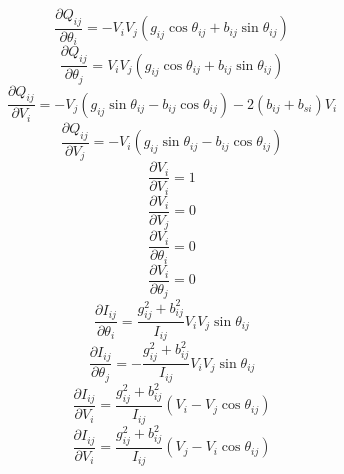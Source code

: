 \documentclass[12pt]{article}
\begin{document}
\begin{equation}
\frac{\partial Q_{ij}}{\partial \theta_i}  = -V_iV_j(g_{ij}\cos\theta_{ij} + b_{ij}\sin{\theta_{ij}})
\end{equation}
\begin{equation}
\frac{\partial Q_{ij}}{\partial \theta_j}  = V_iV_j(g_{ij}\cos\theta_{ij} + b_{ij}\sin{\theta_{ij}})
\end{equation}
\begin{equation}
\frac{\partial Q_{ij}}{\partial V_i}  =-V_j(g_{ij}\sin\theta_{ij}-b_{ij}\cos{\theta_{ij}})-2(b_{ij}+b_{si})V_i
\end{equation}
\begin{equation}
\frac{\partial Q_{ij}}{\partial V_j}  =-V_i(g_{ij}\sin\theta_{ij}-b_{ij}\cos{\theta_{ij}})
\end{equation}
\begin{equation}
\frac{\partial V_i}{\partial V_i}  = 1
\end{equation}
\begin{equation}
\frac{\partial V_i}{\partial V_j}  = 0
\end{equation}
\begin{equation}
\frac{\partial V_i}{\partial \theta_i}  = 0
\end{equation}
\begin{equation}
\frac{\partial V_i}{\partial \theta_j}  = 0
\end{equation}
\begin{equation}
\frac{\partial I_{ij}}{\partial \theta_i}  = \frac{g_{ij}^2+b_{ij}^2}{I_{ij}}V_iV_j\sin{\theta_{ij}} 
\end{equation}
\begin{equation}
\frac{\partial I_{ij}}{\partial \theta_j}  = -\frac{g_{ij}^2+b_{ij}^2}{I_{ij}}V_iV_j\sin{\theta_{ij}}
\end{equation}
\begin{equation}
\frac{\partial I_{ij}}{\partial V_i}  = \frac{g_{ij}^2+b_{ij}^2}{I_{ij}}(V_i-V_j\cos{\theta_{ij}})
\end{equation}
\begin{equation}
\frac{\partial I_{ij}}{\partial V_i}  = \frac{g_{ij}^2+b_{ij}^2}{I_{ij}}(V_j-V_i\cos{\theta_{ij}})
\end{equation}
\end{document}
